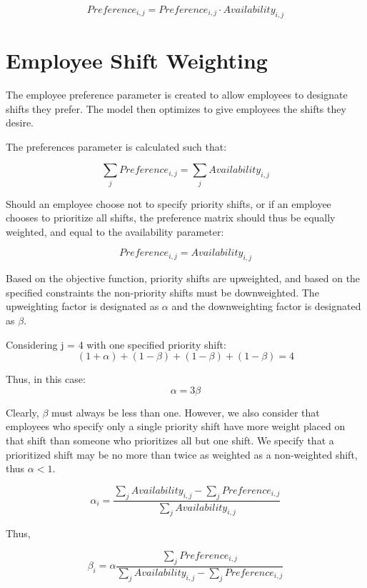 $$ \begin{equation}\label{preference} Preference_{i,j} =   Preference_{i,j} \cdot Availability_{i,j} \end{equation}$$


\section{Employee Shift Weighting}
The employee preference parameter is created to allow employees to designate shifts they prefer. The model then optimizes to give employees the shifts they desire. 

The preferences parameter is calculated such that:

$$\sum\limits_{j}Preference_{i,j} = \sum\limits_{j}Availability_{i,j}$$

Should an employee choose not to specify priority shifts, or if an employee chooses to prioritize all shifts, the preference matrix should thus be equally weighted, and equal to the availability parameter:

$$Preference_{i,j} = Availability_{i,j}$$

Based on the objective function, priority shifts are upweighted, and based on the specified constraints the non-priority shifts must be downweighted. The upweighting factor is designated as $\alpha$ and the downweighting factor is designated as $\beta$. 

Considering j = 4 with one specified priority shift:
$$ (1 + \alpha) + (1-\beta) + (1-\beta) + (1-\beta) = 4 $$

Thus,  in this case: $$\alpha = 3\beta$$

Clearly, $\beta$ must always be less than one. However, we also consider that employees who specify only a single priority shift have more weight placed on that shift than someone who prioritizes all but one shift.  We specify that a prioritized shift may be no more than twice as weighted as a non-weighted shift, thus $\alpha<1$.

$$\alpha_{i} = \frac{\sum\limits_{j}Availability_{i,j} - \sum\limits_{j}Preference_{i,j}}{\sum\limits_{j}Availability_{i,j}}$$

Thus,

$$\beta_{i} = \alpha \frac{\sum\limits_{j}Preference_{i,j}}{\sum\limits_{j}Availability_{i,j} - \sum\limits_{j}Preference_{i,j}}$$

